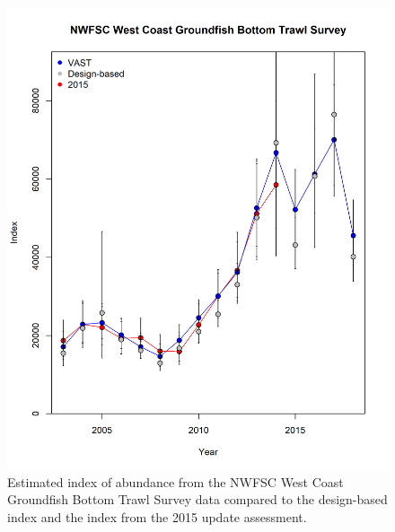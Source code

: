 \documentclass[12pt,]{article}
\begin{document}
\FloatBarrier

\begin{figure}
\centering
\includegraphics{Figures/NWFSC_Index_gamma.png}
\caption{Estimated index of abundance from the NWFSC West Coast
Groundfish Bottom Trawl Survey data compared to the design-based index
and the index from the 2015 update assessment. \label{fig:nw_index}}
\end{figure}

\FloatBarrier
\end{document}
